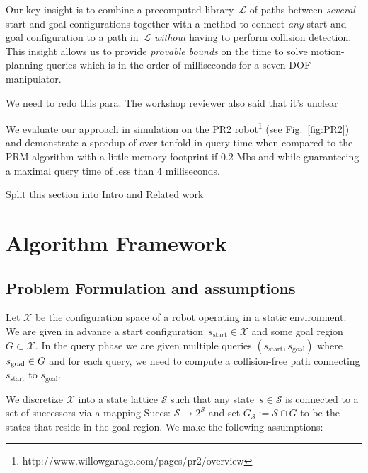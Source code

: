 \documentclass[letterpaper]{article} %
\newcommand{\calX}{\ensuremath{\mathcal{X}}\xspace}
\newcommand{\calL}{\ensuremath{\mathcal{L}}\xspace}
\newcommand{\calS}{\ensuremath{\mathcal{S}}\xspace}
\newcommand{\sStart}{\ensuremath{s_{\text{start}}\xspace}}
\begin{document}

Our key insight is to combine a precomputed library~$\calL$ of paths between \emph{several} start and goal configurations together with a method to connect \emph{any} start and goal configuration to a path in~$\calL$ \emph{without} having to perform collision detection.
This insight allows us to provide \emph{provable bounds} on the time to solve motion-planning queries which is in the order of milliseconds for a seven DOF manipulator.

{\color{blue} We need to redo this para. The workshop reviewer also said that it's unclear}

We evaluate our approach in simulation on the PR2 robot\footnote{http://www.willowgarage.com/pages/pr2/overview} (see Fig.~\ref{fig:PR2})
and demonstrate a speedup of over tenfold in query time when compared to the \textsf{PRM} algorithm with a little memory footprint if 0.2 Mbs and while guaranteeing a maximal query time of less than 4 milliseconds.

{\color{blue} Split this section into Intro and Related work}


\section{Algorithm Framework}
\subsection{Problem Formulation and assumptions}
Let $\calX$ be the configuration space of a robot operating in a static environment.
We are given in advance a start configuration~$\sStart \in \calX$ and some goal region~$G \subset \calX$.
In the query phase we are given multiple queries $(\sStart, s_{\text{goal}})$ where $s_{\rm goal} \in G$ and for each query, we need to compute a collision-free path connecting $\sStart$ to $s_{\text{goal}}$.

We discretize $\calX$ into a state lattice $\calS$ such that any state~$s \in \calS$ is connected to a set of successors via a mapping Succs: $\calS \rightarrow 2^\calS$
and set $G_\calS := \calS \cap G$ to be the states that reside in the goal region.
We make the following assumptions:
\end{document}
